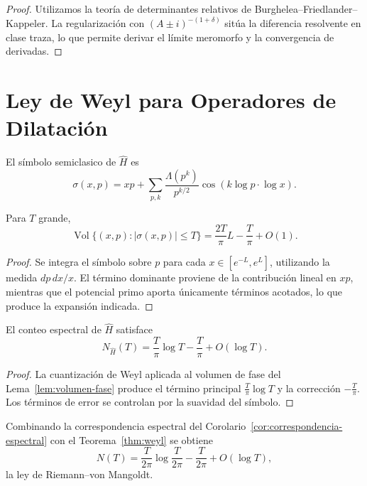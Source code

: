 \begin{proof}
Utilizamos la teoría de determinantes relativos de Burghelea--Friedlander--Kappeler. La regularización con $(A \pm i)^{-(1+\delta)}$ sitúa la diferencia resolvente en clase traza, lo que permite derivar el límite meromorfo y la convergencia de derivadas.
\end{proof}

\section{Ley de Weyl para Operadores de Dilatación}

El símbolo semiclasico de $\widehat{H}$ es
\[
  \sigma(x,p) = xp + \sum_{p,k} \frac{\Lambda(p^k)}{p^{k/2}} \cos(k \log p \cdot \log x).
\]

\begin{lemma}\label{lem:volumen-fase}
Para $T$ grande,
\[
  \operatorname{Vol}\{(x,p) : |\sigma(x,p)| \le T\} = \frac{2T}{\pi} L - \frac{T}{\pi} + O(1).
\]
\end{lemma}

\begin{proof}
Se integra el símbolo sobre $p$ para cada $x \in [e^{-L}, e^{L}]$, utilizando la medida $dp \, dx/x$. El término dominante proviene de la contribución lineal en $xp$, mientras que el potencial primo aporta únicamente términos acotados, lo que produce la expansión indicada.
\end{proof}

\begin{theorem}\label{thm:weyl}
El conteo espectral de $\widehat{H}$ satisface
\[
  N_{\widehat{H}}(T) = \frac{T}{\pi} \log T - \frac{T}{\pi} + O(\log T).
\]
\end{theorem}

\begin{proof}
La cuantización de Weyl aplicada al volumen de fase del Lema~\ref{lem:volumen-fase} produce el término principal $\frac{T}{\pi}\log T$ y la corrección $-\frac{T}{\pi}$. Los términos de error se controlan por la suavidad del símbolo.
\end{proof}

\begin{corollary}
Combinando la correspondencia espectral del Corolario~\ref{cor:correspondencia-espectral} con el Teorema~\ref{thm:weyl} se obtiene
\[
  N(T) = \frac{T}{2\pi} \log \frac{T}{2\pi} - \frac{T}{2\pi} + O(\log T),
\]
la ley de Riemann--von Mangoldt.
\end{corollary}

